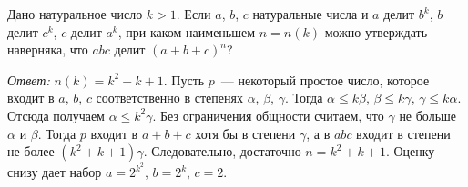 \problem
Дано натуральное число $k > 1$.
Если $a$, $b$, $c$ натуральные числа и
$a$ делит $b^k$, $b$ делит $c^k$, $c$ делит $a^k$,
при каком наименьшем $n = n(k)$ можно утверждать наверняка, что
$a b c$ делит $(a + b + c)^n$?

\solution
\emph{Ответ:} $n(k) = k^2 + k + 1$.
Пусть $p$~--- некоторый простое число, которое входит в $a$, $b$, $c$
соответственно в степенях $\alpha$, $\beta$, $\gamma$.
Тогда
$\alpha \leq k \beta$, $\beta \leq k \gamma$, $\gamma \leq k \alpha$.
Отсюда получаем $\alpha \leq k^2 \gamma$.
Без ограничения общности считаем, что $\gamma$ не больше $\alpha$ и $\beta$.
Тогда $p$ входит в $a + b + c$ хотя бы в степени $\gamma$, а в $a b c$ входит в
степени не более $(k^2 + k + 1) \gamma$.
Следовательно, достаточно $n = k^2 + k + 1$.
Оценку снизу дает набор $a = 2^{k^2}$, $b = 2^k$, $c = 2$.

\endproblem
